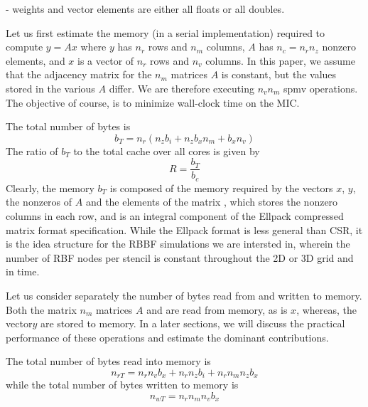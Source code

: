 - weights and vector elements are either all floats or all doubles. 

Let us first estimate the memory (in a serial implementation) required to compute $y = Ax$ where $y$ has $n_r$ rows and $n_m$ columns, $A$ has
$n_c=n_r n_z$ nonzero elements, and $x$ is a vector of $n_r$ rows and 
$n_v$ columns. In this paper, we assume that the adjacency matrix for the
$n_m$ matrices $A$ is constant, but the values stored in the various $A$ differ. We are therefore executing $n_v n_m$ spmv operations. The objective of course, is to minimize wall-clock time on the MIC.

The total number of bytes is 
$$
   b_T = n_r (n_z b_i + n_z b_x n_m + b_x n_v)
$$
The ratio of $b_T$ to the total cache  over all cores is given by
$$
   R = \frac{b_T}{b_c}
$$
Clearly, the memory $b_T$ is composed of the memory required by the vectors $x$, $y$, the nonzeros of $A$ and the elements of the matrix , which stores the nonzero columns in each row, and is an integral component of the Ellpack compressed matrix format specification. While the Ellpack format is less general than CSR, it is the idea structure for the RBBF simulations we are intersted in, wherein the number of RBF nodes per stencil is constant throughout the 2D or 3D grid and in time. 

Let us consider separately the number of bytes read from and written to memory.
Both the matrix $n_m$ matrices $A$  and  are read from memory, as is $x$, whereas, the vector$y$ are stored to memory. In a later sections, we will discuss the practical performance of these operations and estimate the dominant contributions. 

The total number of bytes read into memory is
$$ 
n_{rT} = n_r n_v b_x + n_r n_z b_i + n_r n_m n_z b_x
$$
while the total number of bytes written to memory is
$$
n_{wT} = n_r n_m n_v b_x
$$

